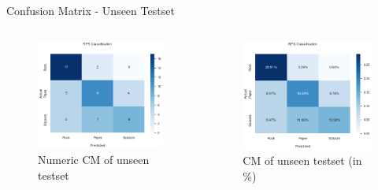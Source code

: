 \documentclass[aspectratio=169]{beamer}
\begin{document}
{	\begin{frame}{Confusion Matrix - Unseen Testset}
		\begin{columns}
			\begin{column}{.5\textwidth}
				\begin{figure}
					\centering
					\includegraphics[width=1\textwidth]{img/CFM_unseen_numeric_10.png}
					\caption{Numeric CM of unseen testset}
				\end{figure}      
			\end{column}
			\begin{column}{.5\textwidth}
				\begin{figure}
					\centering
					\includegraphics[width=1\textwidth]{img/CFM_unseen_percent_10.png}
					\caption{CM of unseen testset (in \%)}
				\end{figure}      
			\end{column} 
		\end{columns}
	\end{frame}

}
\end{document}
